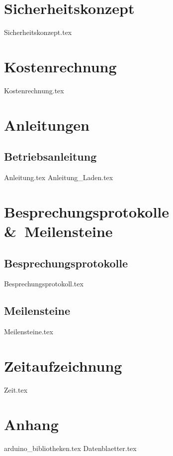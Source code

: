 \documentclass[paper=a4,12pt]{scrreprt}
\begin{document}
\chapter{Sicherheitskonzept}
{Sicherheitskonzept.tex}

\chapter{Kostenrechnung}
{Kostenrechnung.tex}


\chapter{Anleitungen}
\section{Betriebsanleitung}
{Anleitung.tex}
{Anleitung_Laden.tex}

\chapter{Besprechungsprotokolle \&\ Meilensteine}
\section{Besprechungsprotokolle}
{Besprechungsprotokoll.tex}
\section{Meilensteine}
{Meilensteine.tex}

\chapter{Zeitaufzeichnung}
{Zeit.tex}

\chapter{Anhang}
{arduino_bibliotheken.tex}
{Datenblaetter.tex}
\end{document}
